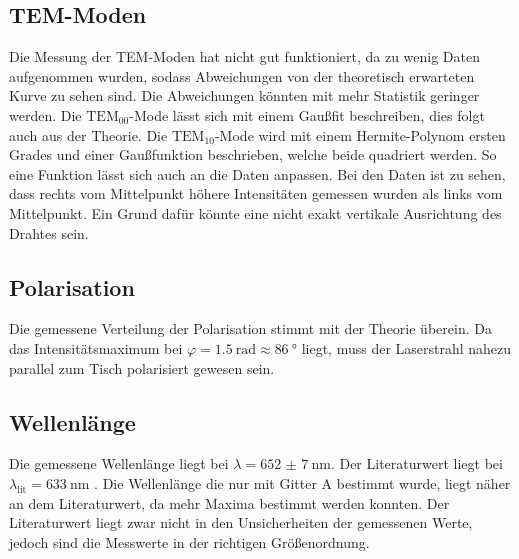 \subsection{TEM-Moden}
Die Messung der TEM-Moden hat nicht gut funktioniert, da zu wenig Daten aufgenommen wurden, sodass Abweichungen 
von der theoretisch erwarteten Kurve zu sehen sind. Die Abweichungen könnten mit mehr Statistik geringer werden. 
Die $\text{TEM}_{00}$-Mode lässt sich mit einem Gaußfit beschreiben, dies folgt auch aus der Theorie. Die 
$\text{TEM}_{10}$-Mode wird mit einem Hermite-Polynom ersten Grades und einer Gaußfunktion beschrieben, welche beide 
quadriert werden. So eine Funktion lässt sich auch an die Daten anpassen. Bei den Daten ist zu sehen, dass rechts 
vom Mittelpunkt höhere Intensitäten gemessen wurden als links vom Mittelpunkt. Ein Grund dafür könnte eine nicht 
exakt vertikale Ausrichtung des Drahtes sein. 

\subsection{Polarisation}
Die gemessene Verteilung der Polarisation stimmt mit der Theorie überein. Da das Intensitätsmaximum bei $\varphi=\SI{1.5}{\radian}\approx\SI{86}{\degree}$
liegt, muss der Laserstrahl nahezu parallel zum Tisch polarisiert gewesen sein.

\subsection{Wellenlänge}
Die gemessene Wellenlänge liegt bei $\lambda = \SI{652(7)}{\nano\meter}$. Der Literaturwert liegt bei $\lambda_{\text{lit}}=\SI{633}{\nano\meter}$ 
\cite{leifi}.
Die Wellenlänge die nur mit Gitter A bestimmt wurde, liegt näher an dem Literaturwert, da mehr Maxima bestimmt werden konnten. 
Der Literaturwert liegt zwar nicht in den Unsicherheiten der gemessenen Werte, jedoch sind die Messwerte in der richtigen 
Größenordnung. 
\newpage